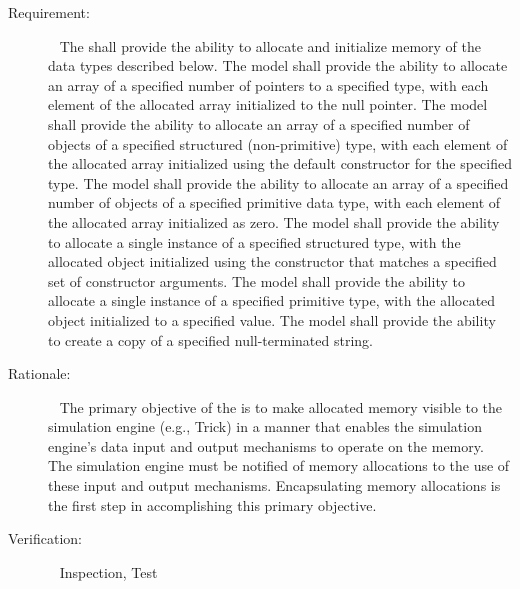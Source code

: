 \label{reqt:alloc}
\begin{description}
\item[Requirement:]\ \newline
  The \ModelDesc shall provide the ability to allocate and initialize
  memory of the data types described below.
  \label{reqt::alloc_pointer_array}
  The model shall provide the ability to allocate an array of a specified
  number of pointers to a specified type, with each element of the allocated
  array initialized to the null pointer.
  \label{reqt::alloc_object_array}
  The model shall provide the ability to allocate an array of a specified
  number of objects of a specified structured (non-primitive) type, with each
  element of the allocated array initialized using the default constructor for
  the specified type.
  \label{reqt::alloc_prim_array}
  The model shall provide the ability to allocate an array of a specified
  number of objects of a specified primitive data type, with each element of
  the allocated array initialized as zero.
  \label{reqt::alloc_object}
  The model shall provide the ability to allocate a single instance of a
  specified structured type, with the allocated object initialized using
  the constructor that matches a specified set of constructor arguments.
  \label{reqt::alloc_prim}
  The model shall provide the ability to allocate a single instance of a
  specified primitive type, with the allocated object initialized to a
  specified value.
  \label{reqt::strdup}
  The model shall provide the ability to create a copy of
  a specified null-terminated string.

\item[Rationale:]\ \newline
  The primary objective of the \ModelDesc is to make allocated memory visible to
  the simulation engine (e.g., Trick) in a manner that enables the simulation
  engine's data input and output mechanisms to operate on the memory.
  The simulation engine must be notified of memory allocations to the use of
  these input and output mechanisms. Encapsulating memory allocations is the
  first step in accomplishing this primary objective.
  
\item[Verification:]\ \newline
  Inspection, Test
\end{description}


